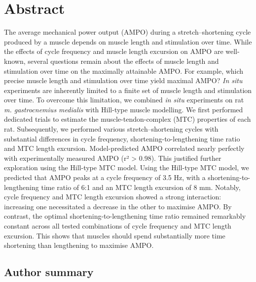 \documentclass[
  10pt,
  letterpaper,
]{article}
\begin{document}
\section*{Abstract}
The average mechanical power output (AMPO) during a stretch--shortening
cycle produced by a muscle depends on muscle length and stimulation over
time. While the effects of cycle frequency and muscle length excursion
on AMPO are well-known, several questions remain about the effects of
muscle length and stimulation over time on the maximally attainable
AMPO. For example, which precise muscle length and stimulation over time
yield maximal AMPO? \emph{In situ} experiments are inherently limited to
a finite set of muscle length and stimulation over time. To overcome
this limitation, we combined \emph{in situ} experiments on rat \emph{m.
gastrocnemius medialis} with Hill-type muscle modelling. We first
performed dedicated trials to estimate the muscle-tendon-complex (MTC)
properties of each rat. Subsequently, we performed various
stretch--shortening cycles with substantial differences in cycle
frequency, shortening-to-lengthening time ratio and MTC length
excursion. Model-predicted AMPO correlated nearly perfectly with
experimentally measured AMPO (r² \textgreater{} 0.98). This justified
further exploration using the Hill-type MTC model. Using the Hill-type
MTC model, we predicted that AMPO peaks at a cycle frequency of 3.5 Hz,
with a shortening-to-lengthening time ratio of 6:1 and an MTC length
excursion of 8 mm. Notably, cycle frequency and MTC length excursion
showed a strong interaction: increasing one necessitated a decrease in
the other to maximise AMPO. By contrast, the optimal
shortening-to-lengthening time ratio remained remarkably constant across
all tested combinations of cycle frequency and MTC length excursion.
This shows that muscles should spend substantially more time shortening
than lengthening to maximise AMPO.


\linenumbers

\nolinenumbers

\subsection*{Author summary}\label{author-summary}
\end{document}
